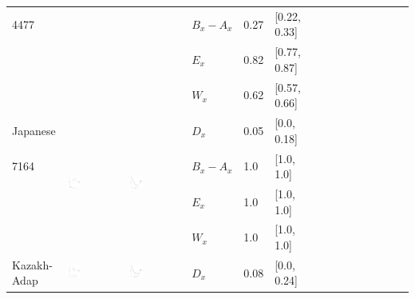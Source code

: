 \documentclass[11pt,letterpaper]{article}
\begin{document}
\begin{longtable}{lllllllllllllll}
4477  &    &    &  $B_x-A_x$  &  0.27  &  [0.22, 0.33]  \\ 
  &    &    &  $E_x$  &  0.82  &  [0.77, 0.87]  \\ 
  &    &    &  $W_x$  &  0.62  &  [0.57, 0.66]  \\ [10.25ex] \hline
Japanese  &  \multirow{4}{*}{\includegraphics[width=0.25\textwidth]{figures/Japanese-entropy-memory.pdf}}  &  \multirow{4}{*}{\includegraphics[width=0.25\textwidth]{figures/Japanese-listener-surprisal-memory.pdf}}  &  $D_x$  &  0.05  &  [0.0, 0.18]  \\ 
7164  &    &    &  $B_x-A_x$  &  1.0  &  [1.0, 1.0]  \\ 
  &    &    &  $E_x$  &  1.0  &  [1.0, 1.0]  \\ 
  &    &    &  $W_x$  &  1.0  &  [1.0, 1.0]  \\ [10.25ex] \hline
Kazakh-Adap  &  \multirow{4}{*}{\includegraphics[width=0.25\textwidth]{figures/Kazakh-Adap-entropy-memory.pdf}}  &  \multirow{4}{*}{\includegraphics[width=0.25\textwidth]{figures/Kazakh-Adap-listener-surprisal-memory.pdf}}  &  $D_x$  &  0.08  &  [0.0, 0.24]  \\ 

\end{longtable}
\end{document}
